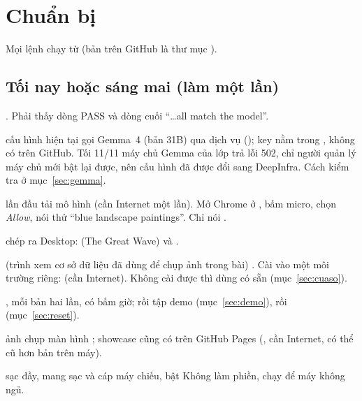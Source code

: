 \section{Chuẩn bị}\label{sec:chuanbi}
Mọi lệnh chạy từ   (bản trên GitHub là thư mục ).

\subsection{Tối nay hoặc sáng mai (làm một lần)}
\begin{checklist}
\item {} . Phải thấy \factTests{} dòng PASS và dòng cuối ``\ldots all match the model''.
\item {} cấu hình hiện tại gọi Gemma~4 (bản 31B) qua dịch vụ  (); key nằm trong , không có trên GitHub. Tối 11/11 máy chủ Gemma của lớp trả lỗi 502, chỉ người quản lý máy chủ mới bật lại được, nên cấu hình đã được đổi sang DeepInfra. Cách kiểm tra ở mục~\ref{sec:gemma}.
\item {} lần đầu  tải mô hình (cần Internet một lần). Mở Chrome ở , bấm micro, chọn \emph{Allow}, nói thử ``blue landscape paintings''. Chỉ nói .
\item {} chép ra Desktop:  (The Great Wave) và .
\item {} (trình xem cơ sở dữ liệu đã dùng để chụp ảnh trong bài) . Cài vào một môi trường riêng:  (cần Internet). Không cài được thì dùng  có sẵn (mục~\ref{sec:cuaso}).
\item {}, mỗi bản hai lần, có bấm giờ; rồi tập demo (mục~\ref{sec:demo}), rồi  (mục~\ref{sec:reset}).
\item {} ảnh chụp màn hình ; showcase cũng có trên GitHub Pages (, cần Internet, có thể cũ hơn bản trên máy).
\item {} sạc đầy, mang sạc và cáp máy chiếu, bật Không làm phiền, chạy  để máy không ngủ.
\end{checklist}

